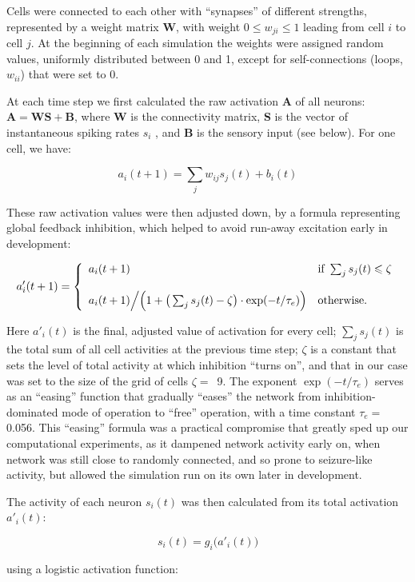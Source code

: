 \documentclass{article}
\begin{document}
Cells were connected to each other with “synapses” of different strengths, represented by a weight matrix \textbf{W}, with weight $0 \leqslant w_{ji} \leqslant 1$ leading from cell $i$ to cell $j$. At the beginning of each simulation the weights were assigned random values, uniformly distributed between 0 and 1, except for self-connections (loops, $w_{ii}$) that were set to 0.

At each time step we first calculated the raw activation \textbf{A} of all neurons: $\textbf{A} = \textbf{WS} + \textbf{B}$, where \textbf{W} is the connectivity matrix, \textbf{S} is the vector of instantaneous spiking rates $s_i$ , and \textbf{B} is the sensory input (see below). For one cell, we have:

\[ a_i(t+1) = \sum_j{w_{ij}s_j(t)} + b_i(t) \]

These raw activation values were then adjusted down, by a formula representing global feedback inhibition, which helped to avoid run-away excitation early in development:

\[ a'_i(t+1) = \left \{ \begin{array}{l l} a_i(t+1)
& \text{if } \sum_j{s_j(t)} \leqslant \zeta \\ 
 & \\
a_i(t+1)\Big/ \Big(1 + \big(\sum_j{s_j(t)} - \zeta\big) \cdot \exp(- t/\tau_e)\Big) 
& \text{otherwise.} \end{array} \right. \]

Here $a'_i(t)$ is the final, adjusted value of activation for every cell; $\sum_j{s_j(t)}$ is the total sum of all cell activities at the previous time step; $\zeta$ is a constant that sets the level of total activity at which inhibition “turns on”, and that in our case was set to the size of the grid of cells \mbox{$\zeta=$ 9}. The exponent $\exp(-t/\tau_e)$ serves as an “easing” function that gradually “eases” the network from inhibition-dominated mode of operation to “free” operation, with a time constant $\tau_e=$ 0.056. This “easing” formula was a practical compromise that greatly sped up our computational experiments, as it dampened network activity early on, when network was still close to randomly connected, and so prone to seizure-like activity, but allowed the simulation run on its own later in development.

The activity of each neuron $s_i(t)$ was then calculated from its total activation $a'_i(t)$:

\[ s_i(t) = g_i\big(a'_i(t)\big) \]

using a logistic activation function: 
\end{document}
